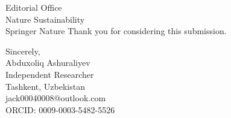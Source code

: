 \documentclass[11pt]{letter}
\begin{document}
\begin{letter}{Editorial Office\\Nature Sustainability\\Springer Nature}
Thank you for considering this submission.

\vspace{0.8cm}
\begin{flushright}
Sincerely,\\[0.3cm]
Abduxoliq Ashuraliyev\\
Independent Researcher\\
Tashkent, Uzbekistan\\
jack00040008@outlook.com\\
ORCID: 0009-0003-5482-5526
\end{flushright}

\end{letter}
\end{document}

